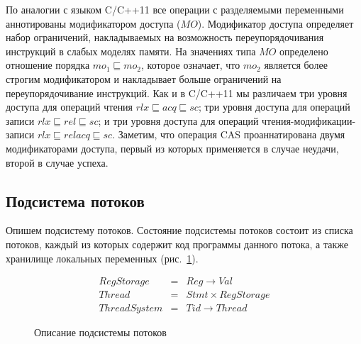 По аналогии с языком C/C++11 
все операции с разделяемыми переменными 
аннотированы модификатором доступа ($MO$).
Модификатор доступа определяет набор ограничений, 
накладываемых на возможность переупорядочивания 
инструкций в слабых моделях памяти.
На значениях типа $MO$ определено отношение порядка
$mo_1 \sqsubseteq mo_2$, которое означает, что 
$mo_2$ является более строгим модификатором 
и накладывает больше ограничений на переупорядочивание инструкций.
Как и в C/C++11 мы различаем три уровня доступа для операций чтения
$rlx \sqsubseteq acq \sqsubseteq sc$;
три уровня доступа для операций записи
$rlx \sqsubseteq rel \sqsubseteq sc$;
и три уровня доступа для операций чтения-модификации-записи
$rlx \sqsubseteq relacq \sqsubseteq sc$.
Заметим, что операция CAS проаннатирована двумя модификаторами доступа,
первый из которых применяется в случае неудачи, второй в случае успеха.

\subsection{Подсистема потоков}

Опишем подсистему потоков.
Состояние подсистемы потоков состоит из списка потоков,
каждый из которых содержит код программы данного потока, 
а также хранилище локальных переменных (рис.~\ref{fig:thread-subsys-def}).

\begin{figure}[thb]
\begin{minipage}{\linewidth}

\[
\begin{array}{rcl}
RegStorage      & = &   Reg \rightarrow Val      \\
Thread          & = &   Stmt \times RegStorage   \\
ThreadSystem    & = &   Tid \rightarrow Thread
\end{array}
\]

\end{minipage}
\caption{Описание подсистемы потоков}
\label{fig:thread-subsys-def}
\end{figure}

